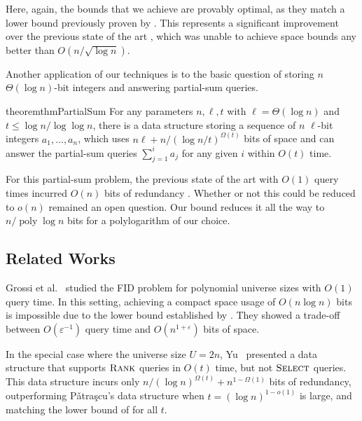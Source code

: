 \documentclass{article}
\theoremstyle{plain}
\theoremstyle{definition}  \newtheorem{definition}[theorem]{Definition}
\DeclareMathOperator{\poly}{poly}
\newcommand{\eps}{\varepsilon}
\renewcommand{\l}{\ell}
\newcommand{\Patrascu}{\textup{P{\v{a}}tra{\c{s}}cu}\xspace}
\newcommand{\rank}{\textup{\textsc{Rank}}\xspace}
\newcommand{\select}{\textup{\textsc{Select}}\xspace}
\begin{document}
Here, again, the bounds that we achieve are provably optimal, as they match a lower bound previously proven by \cite{patrascu2010cellprobe}. This represents a significant improvement over the previous state of the art \cite{raman2007succinct}, which was unable to achieve space bounds any better than $O(n / \sqrt{\log n})$.

\smallskip

Another application of our techniques is to the basic question of storing $n$ $\Theta(\log n)$-bit integers and answering partial-sum queries.

\begin{restatable}{theorem}{thmPartialSum}
  \label{thm:partialsum}
  For any parameters $n, \l, t$ with $\l = \Theta(\log n)$ and $t \le \log n / \log \log n$, there is a data structure storing a sequence of $n$ $\l$-bit integers $a_1, \ldots, a_n$, which uses $n\l + n / (\log n / t)^{\Omega(t)}$ bits of space and can answer the partial-sum queries $\sum_{j=1}^{i} a_j$ for any given $i$ within $O(t)$ time.
\end{restatable}

For this partial-sum problem, the previous state of the art with $O(1)$ query times incurred $O(n)$ bits of redundancy \cite{raman2001succinct}. Whether or not this could be reduced to $o(n)$ remained an open question. Our bound reduces it all the way to $n / \poly \log n$ bits for a polylogarithm of our choice.

\subsection{Related Works}

Grossi et al.~\cite{grossi2009more} studied the FID problem for polynomial universe sizes with $O(1)$ query time. In this setting, achieving a compact space usage of $O(n \log n)$ bits is impossible due to the lower bound established by \cite{patrascu2006timespace}. They showed a trade-off between $O(\eps^{-1})$ query time and $O(n^{1 + \eps})$ bits of space.

In the special case where the universe size $U = 2n$, Yu~\cite{yu2019optimal} presented a data structure that supports $\rank$ queries in $O(t)$ time, but not $\select$ queries. This data structure incurs only $n / (\log n)^{\Omega(t)} + n^{1 - \Omega(1)}$ bits of redundancy, outperforming \Patrascu's data structure when $t = (\log n)^{1 - o(1)}$ is large, and matching the lower bound of \cite{patrascu2006timespace} for all $t$.
\end{document}
